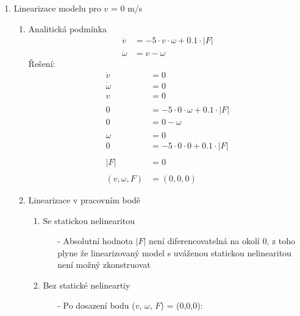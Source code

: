 \documentclass{article}
\begin{document}
\begin{enumerate}
    \item Linearizace modelu pro $v$ = 0 m/s
        \begin{enumerate}
            \item Analitická podmínka
                \label{2.3.a}
                \begin{align*}
                    \dot{v} &= -5 \cdot v \cdot \omega + 0.1 \cdot |F|\\
                    \dot{\omega} &= v - \omega
                \end{align*}
                Řešení:
                \begin{align*}
                    \dot{v} &= 0\\
                    \dot{\omega} &= 0\\
                    v &= 0\\ 
                    \\
                    0 &= -5 \cdot 0 \cdot \omega + 0.1 \cdot |F|\\
                    0 &= 0 - \omega\\
                    \\
                    \omega &= 0\\
                    0 &= -5 \cdot 0 \cdot 0 + 0.1 \cdot |F|\\
                    \\
                    |F| &= 0\\
                    \\
                    (v,\omega,F) &= (0,0,0)
                \end{align*}
            \item Linearizace v pracovním bodě
                \begin{enumerate}
                    \item Se statickou nelinearitou
                        \label{2.3.b.I}
                        \begin{itemize}
                            \item[-] Absolutní hodnota $\left |F \right |$ není diferencovatelná na okolí 0, z toho plyne že linearizovaný model s uváženou statickou nelinearitou není možný zkonstruovat
                        \end{itemize}
                        
                    \newpage
                    \item Bez statické nelineartiy
                        \label{2.3.b.II}
                        \begin{itemize}
                            \item[-] Po dosazení bodu ($v$, $\omega$, $F$) = (0,0,0):
                        \end{itemize}


\end{enumerate}
\end{enumerate}
\end{enumerate}
\end{document}
